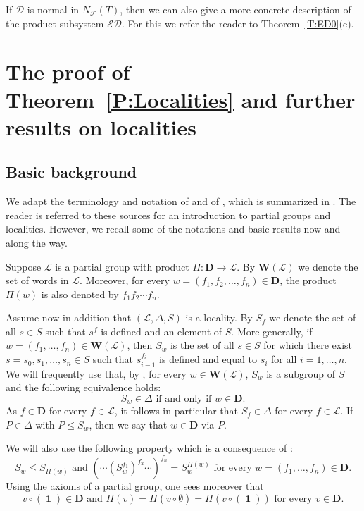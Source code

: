 \documentclass[reqno,11pt]{amsart}
\numberwithin{equation}{section}
\theoremstyle{definition}
\newcommand{\F}{\mathcal{F}}
\newcommand{\E}{\mathcal{E}}
\renewcommand{\L}{\mathcal{L}}
\newcommand{\D}{\mathbf{D}}
\newcommand{\One}{\operatorname{\mathbf{1}}}
\newcommand{\W}{\mathbf{W}}
\newcommand{\mD}{\mathcal{D}}
\begin{document}
If $\mD$ is normal in $N_\F(T)$, then we can also give a more concrete description of the product subsystem $\E\mD$. For this we refer the reader to Theorem~\ref{T:ED0}(e).



\section{The proof of Theorem~\ref{P:Localities} and further results on localities}\label{S:Localities}



\subsection{Basic background}


We adapt the terminology and notation of \cite{Chermak:2015} and of \cite{Henke:2015}, which is summarized in \cite[Sections~3.1-3.5]{Henke:Regular}. The reader is referred to these sources for an introduction to partial groups and localities. However, we recall some of the notations and basic results now and along the way.

\smallskip

Suppose $\L$ is a partial group with product $\Pi\colon \D\rightarrow\L$. By $\W(\L)$ we denote the set of words in $\L$. Moreover,  for every $w=(f_1,f_2,\dots,f_n)\in\D$, the product $\Pi(w)$ is also denoted by $f_1f_2\cdots f_n$.

\smallskip

Assume now in addition that $(\L,\Delta,S)$ is a locality. By $S_f$ we denote the set of all $s\in S$ such that $s^f$ is defined and an element of $S$. More generally, if $w=(f_1,\dots,f_n)\in\W(\L)$, then $S_w$ is the set of all $s\in S$ for which there exist $s=s_0,s_1,\dots,s_n\in S$ such that  $s_{i-1}^{f_i}$ is defined and equal to $s_i$ for all $i=1,\dots,n$. We will frequently use that, by \cite[Corollary~2.6]{Chermak:2015}, for every $w\in\W(\L)$, $S_w$ is a subgroup of $S$ and the following equivalence holds:
\begin{equation}\label{E:1}
 S_w\in\Delta\mbox{ if and only if }w\in\D.
\end{equation}
As $f\in\D$ for every $f\in\L$, it follows in particular that $S_f\in\Delta$ for every $f\in\L$. If $P\in\Delta$ with $P\leq S_w$, then we say that $w\in\D$ via $P$.

\smallskip

We will also use the following property which is a consequence of \cite[Lemma~2.3(c)]{Chermak:2015}:
\begin{equation}\label{E:2}
 S_w\leq S_{\Pi(w)}\mbox{ and }(\cdots(S_w^{f_1})^{f_2}\cdots)^{f_n}=S_w^{\Pi(w)}\mbox{ for every }w=(f_1,\dots,f_n)\in\D.
\end{equation}
Using the axioms of a partial group, one sees moreover that
\begin{equation}\label{E:3}
v\circ (\One)\in\D\mbox{ and }\Pi(v)=\Pi(v\circ\emptyset)=\Pi(v\circ(\One))\mbox{ for every }v\in\D. 
\end{equation}
\end{document}
